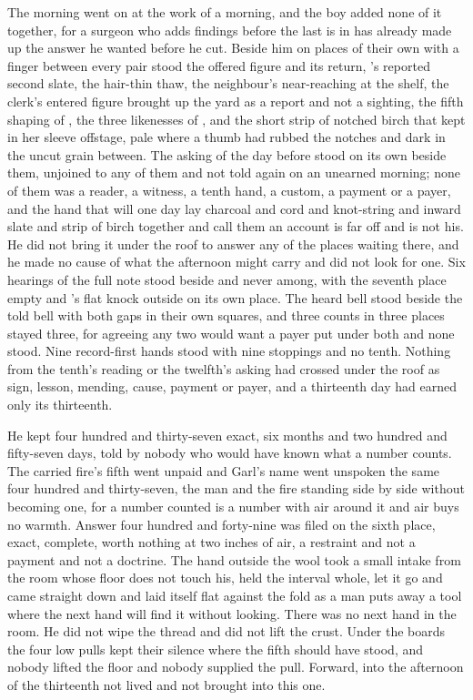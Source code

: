 The morning went on at the work of a morning, and the boy added none of it together, for a surgeon who adds findings before the last is in has already made up the answer he wanted before he cut. Beside him on places of their own with a finger between every pair stood the offered figure and its return, 's reported second slate, the hair-thin thaw, the neighbour's near-reaching at the shelf, the clerk's entered figure brought up the yard as a report and not a sighting, the fifth shaping of , the three likenesses of , and the short strip of notched birch that  kept in her sleeve offstage, pale where a thumb had rubbed the notches and dark in the uncut grain between. The asking of the day before stood on its own beside them, unjoined to any of them and not told again on an unearned morning; none of them was a reader, a witness, a tenth hand, a custom, a payment or a payer, and the hand that will one day lay charcoal and cord and knot-string and inward slate and strip of birch together and call them an account is far off and is not his. He did not bring it under the roof to answer any of the places waiting there, and he made no cause of what the afternoon might carry and did not look for one. Six hearings of the full note stood beside and never among, with the seventh place empty and 's flat knock outside on its own place. The heard bell stood beside the told bell with both gaps in their own squares, and three counts in three places stayed three, for agreeing any two would want a payer put under both and none stood. Nine record-first hands stood with nine stoppings and no tenth. Nothing from the tenth's reading or the twelfth's asking had crossed under the roof as sign, lesson, mending, cause, payment or payer, and a thirteenth day had earned only its thirteenth.

He kept four hundred and thirty-seven exact, six months and two hundred and fifty-seven days, told by nobody who would have known what a number counts. The carried fire's fifth went unpaid and Garl's name went unspoken the same four hundred and thirty-seven, the man and the fire standing side by side without becoming one, for a number counted is a number with air around it and air buys no warmth. Answer four hundred and forty-nine was filed on the sixth place, exact, complete, worth nothing at two inches of air, a restraint and not a payment and not a doctrine. The hand outside the wool took a small intake from the room whose floor does not touch his, held the interval whole, let it go and came straight down and laid itself flat against the fold as a man puts away a tool where the next hand will find it without looking. There was no next hand in the room. He did not wipe the thread and did not lift the crust. Under the boards the four low pulls kept their silence where the fifth should have stood, and nobody lifted the floor and nobody supplied the pull. Forward, into the afternoon of the thirteenth not lived and not brought into this one.
